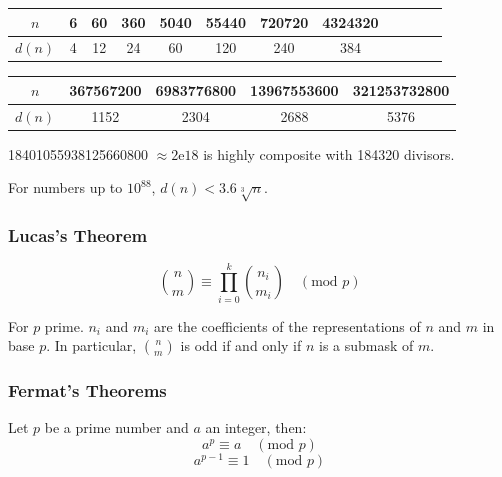 \begin{table}[H]
    \centering
    \begin{tabular}{|c|c|c|c|c|c|c|c|c|c|c|c|}
        \hline
        \cellcolor{gray!40} $n$ & 6 & 60 & 360 & 5040 & 55440 & 720720 & 4324320 \\
        \hline
        \cellcolor{gray!40} $d(n)$ & 4 & 12 & 24 & 60 & 120 & 240 & 384\\
        \hline
    \end{tabular}
\end{table}

\vspace{-30pt}


\begin{table}[H]
    \centering
    \begin{tabular}{|c|c|c|c|c|}
        \hline
        \cellcolor{gray!40} $n$ & 367567200 & 6983776800 & 13967553600 & 321253732800
        \\
        \hline
        \cellcolor{gray!40} $d(n)$ & 1152 & 2304 &  2688 &
        5376 \\
        \hline
    \end{tabular}
\end{table}

18401055938125660800 $\approx 2\text{e}18$ is   highly composite with 184320 divisors.

For numbers up to $10^{88}$, $d(n) < 3.6 \sqrt[3]{n}$.

\subsubsection{Lucas's Theorem}

$$ \binom{n}{m} \equiv \prod_{i=0}^k \binom{n_i}{m_i} \quad (\text{mod } p) $$

For $p$ prime. $n_i$ and $m_i$ are the coefficients of the representations of $n$    and $m$ in base $p$. In particular, $\binom{n}{m}$ is odd if and only if $n$ is a submask of $m$.

\subsubsection{Fermat's Theorems}
Let $p$ be a prime number and $a$ an integer, then:
$$a^p \equiv a \quad (\text{mod } p)$$
$$a^{p-1} \equiv 1 \quad (\text{mod } p)$$

